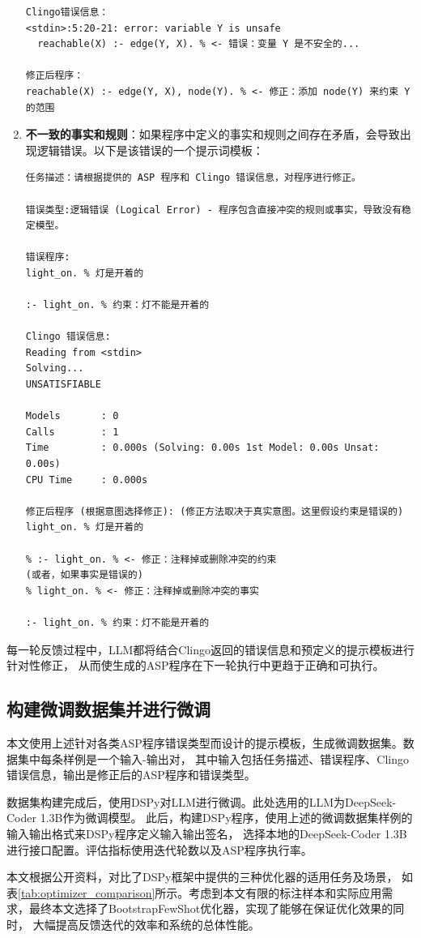 \begin{enumerate}[itemsep=0pt,parsep=0pt]
\begin{lstlisting}
Clingo错误信息：
<stdin>:5:20-21: error: variable Y is unsafe
  reachable(X) :- edge(Y, X). % <- 错误：变量 Y 是不安全的...

修正后程序：
reachable(X) :- edge(Y, X), node(Y). % <- 修正：添加 node(Y) 来约束 Y 的范围
\end{lstlisting}
\item \textbf{不一致的事实和规则}：如果程序中定义的事实和规则之间存在矛盾，会导致出现逻辑错误。以下是该错误的一个提示词模板：
\begin{lstlisting}
任务描述：请根据提供的 ASP 程序和 Clingo 错误信息，对程序进行修正。

错误类型:逻辑错误 (Logical Error) - 程序包含直接冲突的规则或事实，导致没有稳定模型。

错误程序:
light_on. % 灯是开着的

:- light_on. % 约束：灯不能是开着的

Clingo 错误信息:
Reading from <stdin>
Solving...
UNSATISFIABLE

Models       : 0
Calls        : 1
Time         : 0.000s (Solving: 0.00s 1st Model: 0.00s Unsat: 0.00s)
CPU Time     : 0.000s

修正后程序 (根据意图选择修正): (修正方法取决于真实意图。这里假设约束是错误的)
light_on. % 灯是开着的

% :- light_on. % <- 修正：注释掉或删除冲突的约束
(或者，如果事实是错误的)
% light_on. % <- 修正：注释掉或删除冲突的事实

:- light_on. % 约束：灯不能是开着的
\end{lstlisting}
\end{enumerate}
每一轮反馈过程中，LLM都将结合Clingo返回的错误信息和预定义的提示模板进行针对性修正，
从而使生成的ASP程序在下一轮执行中更趋于正确和可执行。

\subsection{构建微调数据集并进行微调}
本文使用上述针对各类ASP程序错误类型而设计的提示模板，生成微调数据集。数据集中每条样例是一个输入-输出对，
其中输入包括任务描述、错误程序、Clingo错误信息，输出是修正后的ASP程序和错误类型。

数据集构建完成后，使用DSPy对LLM进行微调。此处选用的LLM为DeepSeek-Coder 1.3B作为微调模型。
此后，构建DSPy程序，使用上述的微调数据集样例的输入输出格式来DSPy程序定义输入输出签名，
选择本地的DeepSeek-Coder 1.3B进行接口配置。评估指标使用迭代轮数以及ASP程序执行率。

本文根据公开资料，对比了DSPy框架中提供的三种优化器的适用任务及场景，
如表\ref{tab:optimizer_comparison}所示。考虑到本文有限的标注样本和实际应用需求，最终本文选择了BootstrapFewShot优化器，实现了能够在保证优化效果的同时，
大幅提高反馈迭代的效率和系统的总体性能。

